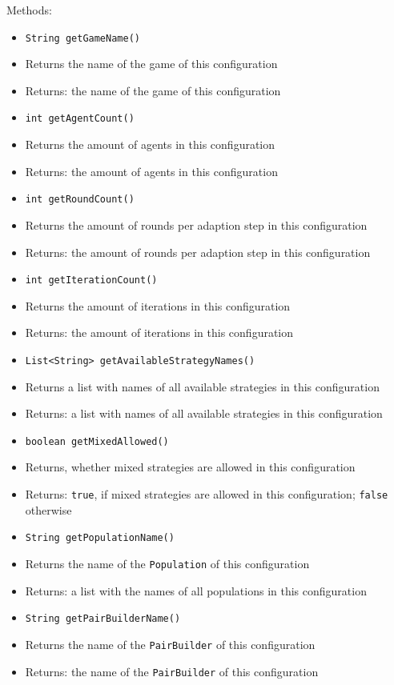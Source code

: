 \documentclass[parskip=full,11pt]{scrartcl}
\begin{document}
Methods:
\begin{itemize}\itemsep -10pt
	\item \texttt{String getGameName()}
	\item[] Returns the name of the game of this configuration
	\item[] Returns: the name of the game of this configuration
	
	\item \texttt{int getAgentCount()}
	\item[] Returns the amount of agents in this configuration
	\item[] Returns: the amount of agents in this configuration
	
	\item \texttt{int getRoundCount()}
	\item[] Returns the amount of rounds per adaption step in this configuration
	\item[] Returns: the amount of rounds per adaption step in this configuration
	
	\item \texttt{int getIterationCount()}
	\item[] Returns the amount of iterations in this configuration
	\item[] Returns: the amount of iterations in this configuration
	
	\item \texttt{List<String> getAvailableStrategyNames()}
	\item[] Returns a list with names of all available strategies in this configuration
	\item[] Returns: a list with names of all available strategies in this configuration
	
	\item \texttt{boolean getMixedAllowed()}
	\item[] Returns, whether mixed strategies are allowed in this configuration
	\item[] Returns: \texttt{true}, if mixed strategies are allowed in this configuration; \texttt{false} otherwise
	
	\item \texttt{String getPopulationName()}
	\item[] Returns the name of the \texttt{Population} of this configuration
	\item[] Returns: a list with the names of all populations in this configuration
	
	\item \texttt{String getPairBuilderName()}
	\item[] Returns the name of the \texttt{PairBuilder} of this configuration
	\item[] Returns: the name of the \texttt{PairBuilder} of this configuration
	

\end{itemize}
\end{document}
